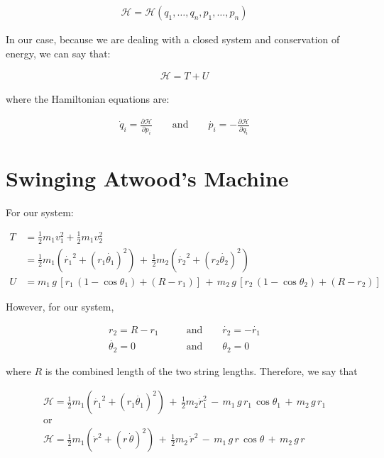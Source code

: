 \documentclass{article}
\begin{document}
\begin{gather*}
\mathscr{H} = \mathscr{H}(q_{1}, \ldots, q_{n}, p_{1}, \ldots, p_{n})
\end{gather*}

In our case, because we are dealing with a closed system and conservation of energy, we can say that:

\begin{gather*}
\mathscr{H} = T + U
\end{gather*}

where the Hamiltonian equations are:

\begin{gather*}
\dot{q}_{i} = \frac{\partial \mathscr{H}}{\partial p_{i}} \qquad\text{and}\qquad \dot{p_{i}} = - \frac{\partial \mathscr{H}}{\partial q_{i}}
\end{gather*}

\section*{Swinging Atwood's Machine}

For our system:

\begin{align*}
T &= \frac{1}{2}m_{1}v_{1}^{2}+\frac{1}{2}m_{1}v_{2}^{2} \\
&= \frac{1}{2}m_{1}\left( \dot{r_{1}}^{2} + (r_{1}\dot{\theta_{1}})^{2} \right) \,+\, \frac{1}{2}m_{2}\left( \dot{r_{2}}^{2} + (r_{2}\dot{\theta_{2}})^{2} \right) \\
U &= m_{1} \, g \, \left[ r_{1} \, (1-\cos{\theta_{1}}) + (R - r_{1}) \right] \,+\, m_{2} \, g \, \left[ r_{2} \, (1-\cos{\theta_{2}}) + (R - r_{2})\right]
\end{align*}

However, for our system, 

\begin{align*}
r_{2} = R - r_{1} \qquad&\text{and}\qquad \dot{r_{2}} = -\dot{r_{1}} \\
\dot{\theta_{2}} = 0 \qquad&\text{and}\qquad \theta_{2} = 0
\end{align*}

where $R$ is the combined length of the two string lengths.  Therefore, we say that

\begin{gather*}
\mathscr{H} = \frac{1}{2}m_{1}\left( \dot{r_{1}}^{2} + (r_{1}\dot{\theta_{1}})^{2} \right) \,+\, \frac{1}{2}m_{2}\dot{r}_{1}^{2} \,-\, m_{1}\,g\,r_{1}\,\cos{\theta_{1}} \,+\, m_{2}\,g\,r_{1} \\
\text{or} \\
\mathscr{H} = \frac{1}{2}m_{1}\left( \dot{r}^{2} + (r\,\dot{\theta})^{2} \right) \,+\, \frac{1}{2}m_{2}\,\dot{r}^{2} \,-\, m_{1}\,g\,r\,\cos{\theta} \,+\, m_{2}\,g\,r
\end{gather*}
\end{document}
